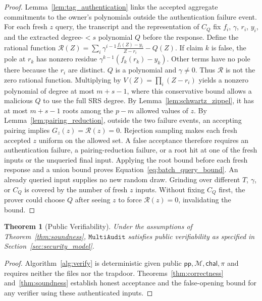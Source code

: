 \documentclass[lettersize,journal]{IEEEtran}
\newtheorem{theorem}{Theorem}
\newcommand{\MultiAudit}{\ensuremath{\mathtt{MultiAudit}}}
\begin{document}
\begin{proof}
Lemma~\ref{lem:tag_authentication} links the accepted aggregate commitments to the owner's polynomials outside the authentication failure event. For each fresh $z$ query, the transcript and the representation of $C_Q$ fix $f_i$, $\gamma$, $r_i$, $y_i$, and the extracted degree-$<s$ polynomial $Q$ before the response. Define the rational function
$\mathcal R(Z)=\sum_i\gamma^{i-1}\frac{f_i(Z)-y_i}{Z-r_i}-Q(Z).$
If claim $k$ is false, the pole at $r_k$ has nonzero residue $\gamma^{k-1}(f_k(r_k)-y_k)$. Other terms have no pole there because the $r_i$ are distinct. $Q$ is a polynomial and $\gamma\ne0$. Thus $\mathcal R$ is not the zero rational function. Multiplying by $V(Z)=\prod_i(Z-r_i)$ yields a nonzero polynomial of degree at most $m+s-1$, where this conservative bound allows a malicious $Q$ to use the full SRS degree. By Lemma~\ref{lem:schwartz_zippel}, it has at most $m+s-1$ roots among the $p-m$ allowed values of $z$.
By Lemma~\ref{lem:pairing_reduction}, outside the two failure events, an accepting pairing implies $G_z(z)=\mathcal R(z)=0$. Rejection sampling makes each fresh accepted $z$ uniform on the allowed set. A false acceptance therefore requires an authentication failure, a pairing-reduction failure, or a root hit at one of the fresh inputs or the unqueried final input. Applying the root bound before each fresh response and a union bound proves Equation~\eqref{eq:batch_query_bound}. An already queried input supplies no new random draw. Grinding over different $T$, $\gamma$, or $C_Q$ is covered by the number of fresh $z$ inputs. Without fixing $C_Q$ first, the prover could choose $Q$ after seeing $z$ to force $\mathcal R(z)=0$, invalidating the bound.
\end{proof}

\begin{samepage}
\begin{theorem}[Public Verifiability]\label{thm:public_verifiability}
Under the assumptions of Theorem~\ref{thm:soundness}, \MultiAudit{} satisfies public verifiability as specified in Section~\ref{sec:security_model}.
\end{theorem}
\begin{proof}
Algorithm~\ref{alg:verify} is deterministic given public $\mathsf{pp},\mathcal M,\mathsf{chal},\pi$ and requires neither the files nor the trapdoor. Theorems~\ref{thm:correctness} and~\ref{thm:soundness} establish honest acceptance and the false-opening bound for any verifier using these authenticated inputs.
\end{proof}
\end{samepage}
\end{document}
